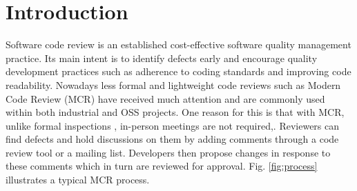 
\section{Introduction}
Software code review is an established cost-effective software quality management practice.
Its main intent is to  identify  defects early and encourage quality development practices such as adherence to coding standards and improving code readability.
Nowadays less formal and lightweight code reviews such as Modern Code Review (MCR)\cite{Bacchelli2013a} have received much attention and are commonly used within both industrial and OSS projects.
One reason for this is that with MCR, unlike formal inspections \cite{Fagan:1976:DCI:1661010.1661012}, in-person meetings are not required,.
Reviewers can find defects and hold discussions on them by adding comments through a code review tool or a mailing list.
Developers then propose changes in response to these comments which in turn are reviewed for approval.  Fig. \ref{fig:process} illustrates a typical MCR process. 

